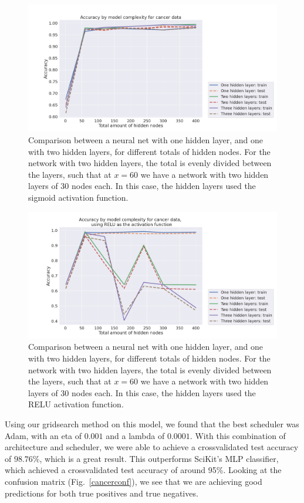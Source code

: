\documentclass[onecolumn,10pt,cleanfoot]{asme2ej}
\begin{document}
\begin{figure}[h]
\centerline{\includegraphics[width=6in]{figure/cancerarchcompsigmoid.png}}
\caption{Comparison between a neural net with one hidden layer, and one with two hidden layers, for different totals of hidden nodes. For the network with two hidden layers, the total is evenly divided between the layers, such that at $x = 60$ we have a network with two hidden layers of 30 nodes each. In this case, the hidden layers used the sigmoid activation function.}
\label{cancerarchcompsigmoid}
\end{figure}

\begin{figure}[h]
\centerline{\includegraphics[width=6in]{figure/cancerarchcomp.png}}
\caption{Comparison between a neural net with one hidden layer, and one with two hidden layers, for different totals of hidden nodes. For the network with two hidden layers, the total is evenly divided between the layers, such that at $x = 60$ we have a network with two hidden layers of 30 nodes each. In this case, the hidden layers used the RELU activation function.}
\label{cancerarchcomp}
\end{figure}

Using our gridsearch method on this model, we found that the best scheduler was Adam, with an eta of $0.001$ and a lambda of $0.0001$. With this combination of architecture and scheduler, we were able to achieve a crossvalidated test accuracy of $98.76\%$, which is a great result. This outperforms SciKit's MLP classifier, which achieved a crossvalidated test accuracy of around 95\%. Looking at the confusion matrix (Fig.~\ref{cancerconf}), we see that we are achieving good predictions for both true positives and true negatives.
\end{document}
